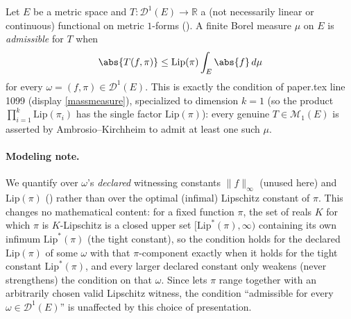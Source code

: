 \begin{definition}
  Let $E$ be a metric space and $T \colon \mathcal{D}^1(E) \to \mathbb{R}$ a (not necessarily
  linear or continuous) functional on metric $1$-forms (). A finite Borel measure
  $\mu$ on $E$ is \emph{admissible} for $T$ when
  \[
    \abs{T(f,\pi)} \le \mathrm{Lip}(\pi) \int_E \abs{f} \, d\mu
  \]
  for every $\omega = (f,\pi) \in \mathcal{D}^1(E)$. This is exactly the condition of paper.tex
  line 1099 (display \eqref{massmeasure}), specialized to dimension $k=1$ (so the product
  $\prod_{i=1}^k \mathrm{Lip}(\pi_i)$ has the single factor $\mathrm{Lip}(\pi)$): every genuine
  $T \in \mathcal{M}_1(E)$ is asserted by Ambrosio--Kirchheim to admit at least one such $\mu$.

  \paragraph{Modeling note.} We quantify over $\omega$'s \emph{declared} witnessing constants
  $\|f\|_\infty$ (unused here) and $\mathrm{Lip}(\pi)$ () rather than over the
  optimal (infimal) Lipschitz constant of $\pi$. This changes no mathematical content: for a fixed
  function $\pi$, the set of reals $K$ for which $\pi$ is $K$-Lipschitz is a closed upper set
  $[\mathrm{Lip}^*(\pi),\infty)$ containing its own infimum $\mathrm{Lip}^*(\pi)$ (the tight
  constant), so the condition holds for the declared $\mathrm{Lip}(\pi)$ of some $\omega$ with that
  $\pi$-component exactly when it holds for the tight constant $\mathrm{Lip}^*(\pi)$, and every
  larger declared constant only weakens (never strengthens) the condition on that $\omega$. Since
   lets $\pi$ range together with an arbitrarily chosen valid Lipschitz witness, the
  condition ``admissible for every $\omega \in \mathcal{D}^1(E)$'' is unaffected by this choice of
  presentation.
\end{definition}
